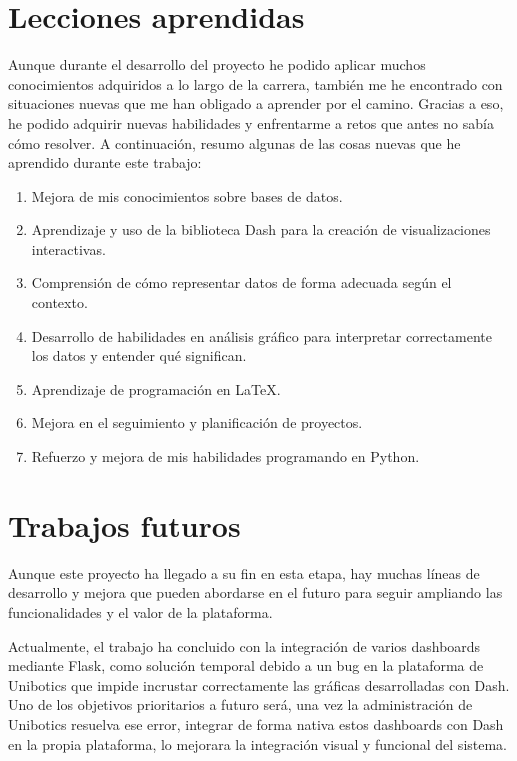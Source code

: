 \documentclass[a4paper, 12pt]{book}
\begin{document}
\section{Lecciones aprendidas}
\label{sec:lecciones_aprendidas}

Aunque durante el desarrollo del proyecto he podido aplicar muchos conocimientos adquiridos a lo largo de la carrera, también me he encontrado con situaciones nuevas que me han obligado a aprender por el camino. Gracias a eso, he podido adquirir nuevas habilidades y enfrentarme a retos que antes no sabía cómo resolver. A continuación, resumo algunas de las cosas nuevas que he aprendido durante este trabajo:

\begin{enumerate}
    \item Mejora de mis conocimientos sobre bases de datos.
    \item Aprendizaje y uso de la biblioteca Dash para la creación de visualizaciones interactivas.
    \item Comprensión de cómo representar datos de forma adecuada según el contexto.
    \item Desarrollo de habilidades en análisis gráfico para interpretar correctamente los datos y entender qué significan.
    \item Aprendizaje de programación en LaTeX.
    \item Mejora en el seguimiento y planificación de proyectos.
    \item Refuerzo y mejora de mis habilidades programando en Python.
\end{enumerate}


\section{Trabajos futuros}
\label{sec:trabajos_futuros}

Aunque este proyecto ha llegado a su fin en esta etapa, hay muchas líneas de desarrollo y mejora que pueden abordarse en el futuro para seguir ampliando las funcionalidades y el valor de la plataforma.

Actualmente, el trabajo ha concluido con la integración de varios dashboards mediante Flask, como solución temporal debido a un bug en la plataforma de Unibotics que impide incrustar correctamente las gráficas desarrolladas con Dash. Uno de los objetivos prioritarios a futuro será, una vez la administración de Unibotics resuelva ese error, integrar de forma nativa estos dashboards con Dash en la propia plataforma, lo mejorara la integración visual y funcional del sistema.
\end{document}
